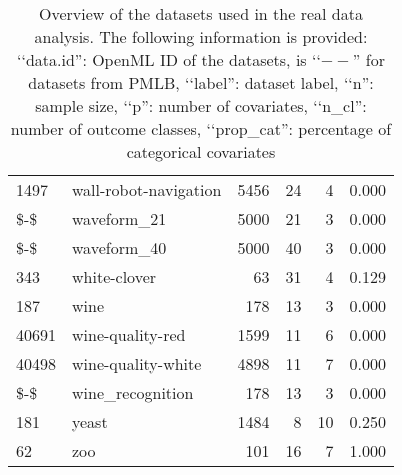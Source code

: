 \begin{table}[ht]
\begin{tabular}{llrrrl}
  1497 & wall-robot-navigation & 5456 & 24 & 4 & 0.000 \\ 
  \$-\$ & waveform\_21 & 5000 & 21 & 3 & 0.000 \\ 
  \$-\$ & waveform\_40 & 5000 & 40 & 3 & 0.000 \\ 
  343 & white-clover & 63 & 31 & 4 & 0.129 \\ 
  187 & wine & 178 & 13 & 3 & 0.000 \\ 
  40691 & wine-quality-red & 1599 & 11 & 6 & 0.000 \\ 
  40498 & wine-quality-white & 4898 & 11 & 7 & 0.000 \\ 
  \$-\$ & wine\_recognition & 178 & 13 & 3 & 0.000 \\ 
  181 & yeast & 1484 & 8 & 10 & 0.250 \\ 
  62 & zoo & 101 & 16 & 7 & 1.000 \\ 
   \hline
\end{tabular}
\caption{Overview of the datasets used in the real data analysis. The following information is provided: \lq\lq data.id'': OpenML ID of the datasets, is \lq\lq $--$'' for datasets from PMLB, \lq\lq label'': dataset label, \lq\lq n'': sample size, \lq\lq p'': number of covariates, \lq\lq n\_cl'': number of outcome classes, \lq\lq prop\_cat'': percentage of categorical covariates} 
\label{tab:data_overview}
\end{table}
